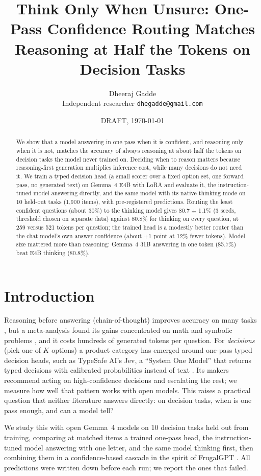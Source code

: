 \documentclass[11pt]{article}
\title{Think Only When Unsure: One-Pass Confidence Routing Matches\\Reasoning at Half the Tokens on Decision Tasks}
\author{Dheeraj Gadde\\\small Independent researcher \quad \texttt{dhegadde@gmail.com}}
\date{DRAFT, \today}
\begin{document}
\maketitle

\begin{abstract}
We show that a model answering in one pass when it is confident, and reasoning only when it is not, matches
the accuracy of always reasoning at about half the tokens on decision tasks the model never trained on.
Deciding when to reason matters because reasoning-first generation multiplies inference cost, while many
decisions do not need it.
We train a typed decision head (a small scorer over a fixed option set, one forward pass, no generated text)
on Gemma~4 E4B with LoRA and evaluate it, the instruction-tuned model answering directly, and the same model
with its native thinking mode on 10 held-out tasks (1,900 items), with pre-registered predictions.
Routing the least confident questions (about 30\%) to the thinking model gives 80.7 $\pm$ 1.1\% (3 seeds, threshold
chosen on separate data) against 80.8\% for thinking on every question, at 259 versus 521 tokens per question;
the trained head is a modestly better router than the chat model's own answer confidence (about +1 point at
12\% fewer tokens).
Model size mattered more than reasoning: Gemma~4 31B answering in one token (85.7\%) beat E4B thinking (80.8\%).
\end{abstract}

\section{Introduction}
Reasoning before answering (chain-of-thought) improves accuracy on many tasks \citep{wei2023chainofthoughtpromptingelicitsreasoning},
but a meta-analysis found its gains concentrated on math and symbolic problems
\citep{sprague2025cotcotchainofthoughthelps}, and it costs hundreds of generated tokens per question.
For \emph{decisions} (pick one of $K$ options) a product category has emerged around one-pass typed decision
heads, such as TypeSafe AI's Jev, a ``System One Model'' that returns typed decisions with calibrated
probabilities instead of text \citep{jev}. Its makers recommend acting on high-confidence decisions and escalating
the rest; we measure how well that pattern works with open models. This raises a
practical question that neither literature answers directly: on decision tasks, when is one pass enough, and
can a model tell?

We study this with open Gemma~4 models \citep{gemma4} on 10 decision tasks held out from training, comparing
at matched items a trained one-pass head, the instruction-tuned model answering with one letter, and the same
model thinking first, then combining them in a confidence-based cascade in the spirit of FrugalGPT
\citep{chen2023frugalgptuselargelanguage}. All predictions were written down before each run; we report the
ones that failed.
\end{document}
